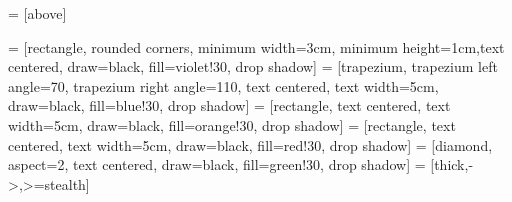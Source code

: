 \newcommand{\vspacing}{0.8cm}

\usetikzlibrary{shapes.geometric, arrows, positioning, shadows}


 = [above]

\newcommand{\background}[7]{%
  \begin{pgfonlayer}{background}
    \path (#1.west |- #2.north)+(-0.5,0.5) node (a1) {};
    \path (#3.east |- #4.south)+(+0.5,-0.25) node (a2) {};
    \path[fill=#7,rounded corners, draw=black!50, dashed]
      (a1) rectangle (a2);
    \path (a1.east |- a1.south)+(1.2,-0.3) node (u1)[texte]
      {\scriptsize\textit{#6}};
  \end{pgfonlayer}}

 = [rectangle, rounded corners, minimum width=3cm, minimum height=1cm,text centered, draw=black, fill=violet!30, drop shadow]
 = [trapezium, trapezium left angle=70, trapezium right angle=110, text centered, text width=5cm, draw=black, fill=blue!30, drop shadow]
 = [rectangle, text centered, text width=5cm, draw=black, fill=orange!30, drop shadow]
 = [rectangle, text centered, text width=5cm, draw=black, fill=red!30, drop shadow]
 = [diamond, aspect=2, text centered, draw=black, fill=green!30, drop shadow]
 = [thick,->,>=stealth]
